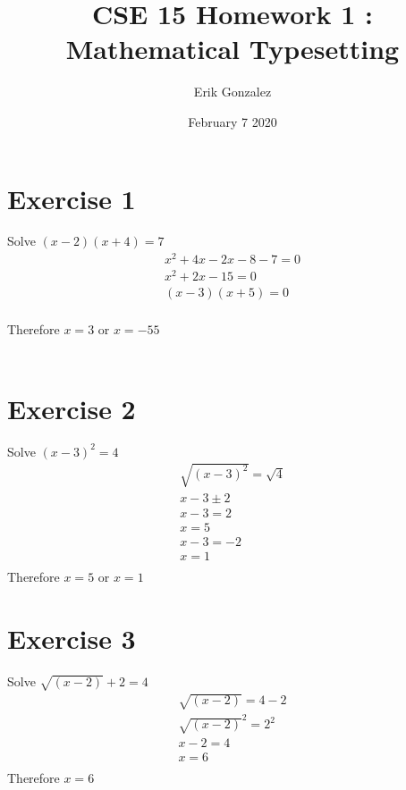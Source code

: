 \documentclass{article}
\title{CSE 15 Homework 1 : Mathematical Typesetting}
\author{Erik Gonzalez}
\date{February 7 2020}
\begin{document}
\maketitle

\section*{Exercise 1}
Solve $(x-2)(x+4) = 7$\\
\begin{align*}
    x^2 +4x - 2x - 8 - 7 = 0\\
    x^2 + 2x - 15 = 0\\
    (x - 3)(x + 5) = 0\\
\end{align*}

Therefore $x = 3$ or $x = -55$\\\\

\section*{Exercise 2}
Solve $(x-3)^2 = 4$\\
\begin{align*}
    \sqrt{(x-3)^2} = \sqrt{4}\\
    x-3 \pm 2\\
    x - 3 = 2\\
    x = 5\\
    x - 3 = -2\\
    x = 1 \\
\end{align*}
Therefore $x = 5$ or $x = 1$

\section*{Exercise 3}
Solve $\sqrt{(x-2)} + 2 = 4$
\begin{align*}
    \sqrt{(x-2)} = 4 - 2\\
    \sqrt{(x-2)}^2 = 2^2\\
    x - 2 = 4\\
    x = 6\\
\end{align*}
Therefore $x = 6$
\end{document}
